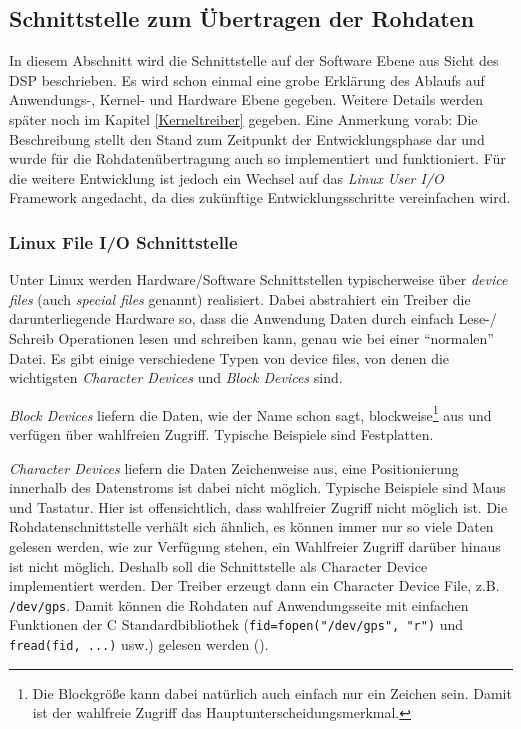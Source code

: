 
\subsection{Schnittstelle zum Übertragen der Rohdaten}
In diesem Abschnitt wird die Schnittstelle auf der Software Ebene aus Sicht des DSP beschrieben. Es wird schon einmal eine grobe Erklärung des Ablaufs auf Anwendungs-, Kernel- und Hardware Ebene gegeben. Weitere Details werden später noch im Kapitel \ref{Kerneltreiber} gegeben. Eine Anmerkung vorab: Die Beschreibung stellt den Stand zum Zeitpunkt der Entwicklungsphase dar und wurde für die Rohdatenübertragung auch so implementiert und funktioniert. Für die weitere Entwicklung ist jedoch ein Wechsel auf das \emph{Linux User I/O} Framework angedacht, da dies zukünftige Entwicklungsschritte vereinfachen wird. 

\subsubsection{Linux File I/O Schnittstelle}
Unter Linux werden Hardware/Software Schnittstellen typischerweise über \emph{device files} (auch \emph{special files} genannt) realisiert. Dabei abstrahiert ein Treiber die darunterliegende Hardware so, dass die Anwendung Daten durch einfach Lese-/ Schreib Operationen lesen und schreiben kann, genau wie bei einer \enquote{normalen} Datei. Es gibt einige verschiedene Typen von device files, von denen die wichtigsten \emph{Character Devices} und \emph{Block Devices} sind. 

\emph{Block Devices} liefern die Daten, wie der Name schon sagt, blockweise\footnote{Die Blockgröße kann dabei natürlich auch einfach nur ein Zeichen sein. Damit ist der wahlfreie Zugriff das Hauptunterscheidungsmerkmal.} aus und verfügen über wahlfreien Zugriff. Typische Beispiele sind Festplatten.

\emph{Character Devices} liefern die Daten Zeichenweise aus, eine Positionierung innerhalb des Datenstroms ist dabei nicht möglich. Typische Beispiele sind Maus und Tastatur. Hier ist offensichtlich, dass wahlfreier Zugriff nicht möglich ist. Die Rohdatenschnittstelle verhält sich ähnlich, es können immer nur so viele Daten gelesen werden, wie zur Verfügung stehen, ein Wahlfreier Zugriff darüber hinaus ist nicht möglich. Deshalb soll die Schnittstelle als Character Device implementiert werden. Der Treiber erzeugt dann ein Character Device File, z.B. \lstinline$/dev/gps$. Damit können die Rohdaten auf Anwendungsseite mit einfachen Funktionen der C Standardbibliothek (\lstinline$fid=fopen("/dev/gps", "r")$ und \lstinline$fread(fid, ...)$ usw.) gelesen werden ().

